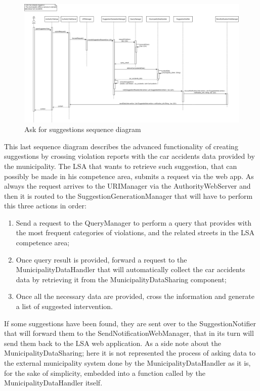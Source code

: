 \begin{figure}[H]
  \centering
  \includegraphics[width=1\textwidth]{Images/UML_diagrams/Sequence_Diagrams/Ask_for_suggestions_sd.png}
  \caption{Ask for suggestions sequence diagram}
  \label{fig:ask_suggestions_sd}
\end{figure}
This last sequence diagram describes the advanced functionality of creating suggestions by crossing violation reports with the car accidents data provided by the municipality. The LSA that wants to retrieve such suggestion, that can possibly be made in his competence area, submits a request via the web app. As always the request arrives to the URIManager via the AuthorityWebServer and then it is routed to the SuggestionGenerationManager that will have to perform this three actions in order:
\begin{enumerate}
  \item Send a request to the QueryManager to perform a query that provides with the most frequent categories of violations, and the related streets in the LSA competence area;
  \item Once query result is provided, forward a request to the MunicipalityDataHandler that will automatically collect the car accidents data by retrieving it from the MunicipalityDataSharing component;
  \item Once all the necessary data are provided, cross the information and generate a list of suggested intervention. 
\end{enumerate}

If some suggestions have been found, they are sent over to the SuggestionNotifier that will forward them to the SendNotificationWebManager, that in its turn will send them back to the LSA web application. As a side note about the MunicipalityDataSharing; here it is not represented the process of asking data to the external municipality system done by the MunicipalityDataHandler as it is, for the sake of simplicity, embedded into a function called by the MunicipalityDataHandler itself. 
